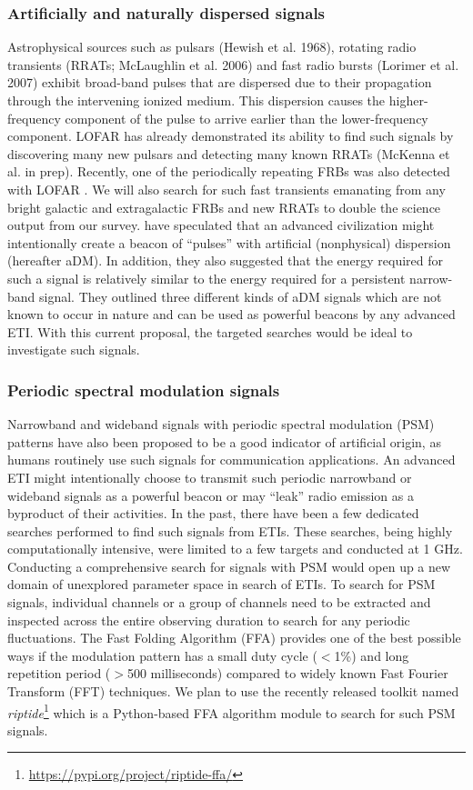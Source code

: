 \documentclass{aastex63}
\begin{document}
\subsubsection{Artificially and naturally dispersed signals}
Astrophysical sources such as pulsars (Hewish et al. 1968), rotating radio transients (RRATs; McLaughlin et al. 2006) and fast radio bursts (Lorimer et al. 2007) exhibit broad-band pulses that are dispersed due to their propagation through the intervening ionized medium. This dispersion causes the higher-frequency component of the pulse to arrive earlier than the lower-frequency component. LOFAR has already demonstrated its ability to find such signals by discovering many new pulsars \citep{LOFAR_pilot_pulsar_2014} and detecting many known RRATs (McKenna et al. in prep). Recently, one of the periodically repeating FRBs was also detected with LOFAR \citep{LOFAR_R3_2021}. We will also search for such fast transients emanating from any bright galactic and extragalactic FRBs and new RRATs to double the science output from our survey. \cite{Gajjar_2021_BLGC1} have speculated that an advanced civilization might intentionally create a beacon of “pulses” with artificial (nonphysical) dispersion (hereafter aDM). In addition, they also suggested that the energy required for such a signal is relatively similar to the energy required for a persistent narrow-band signal. They outlined three different kinds of aDM signals which are not known to occur in nature and can be used as powerful beacons by any advanced ETI. With this current proposal, the targeted searches would be ideal to investigate such signals. 

\subsubsection{Periodic spectral modulation signals}
Narrowband and wideband signals with periodic spectral modulation (PSM) patterns have also been proposed to be a good indicator of artificial origin, as humans routinely use such signals for communication applications. An advanced ETI might intentionally choose to transmit such periodic narrowband or wideband signals as a powerful beacon or may “leak” radio emission as a byproduct of their activities. In the past, there have been a few dedicated searches performed to find such signals from ETIs. These searches, being highly computationally intensive, were limited to a few targets and conducted at 1 GHz. Conducting a comprehensive search for signals with PSM would open up a new domain of unexplored parameter space in search of ETIs. To search for PSM signals, individual channels or a group of channels need to be extracted and inspected across the entire observing duration to search for any periodic fluctuations. The Fast Folding Algorithm (FFA) provides one of the best possible ways if the modulation pattern has a small duty cycle ($<$1\%) and long repetition period ($>$500 milliseconds) compared to widely known Fast Fourier Transform (FFT) techniques. We plan to use the recently released toolkit named {\itshape riptide}\footnote{\url{https://pypi.org/project/riptide-ffa/}} which is a Python-based FFA algorithm module to search for such PSM signals. 
\end{document}
